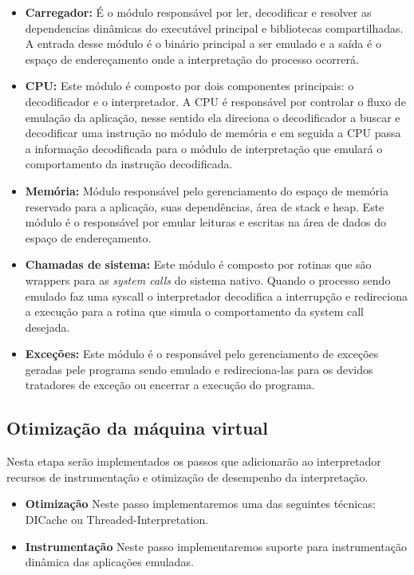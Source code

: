 \documentclass[11pt,twoside]{article}
\begin{document}
\begin{itemize}
    \item \textbf{Carregador:} É o módulo responsável por ler, decodificar e resolver as
    dependencias dinâmicas do executável principal e bibliotecas compartilhadas. A entrada 
    desse módulo é o binário principal a ser emulado e a saída é o espaço de endereçamento 
    onde a interpretação do processo ocorrerá.

    \item \textbf{CPU:} Este módulo é composto por dois componentes principais: o decodificador
    e o interpretador. A CPU é responsável por controlar o fluxo de emulação da aplicação,
    nesse sentido ela direciona o decodificador a buscar e decodificar uma instrução no
    módulo de memória e em seguida a CPU passa a informação decodificada para o módulo de 
    interpretação que emulará o comportamento da instrução decodificada.

    \item \textbf{Memória:} Módulo responsável pelo gerenciamento do espaço de memória reservado 
    para a aplicação, suas dependências, área de stack e heap. Este módulo é o responsável por
    emular leituras e escritas na área de dados do espaço de endereçamento.

    \item \textbf{Chamadas de sistema:} Este módulo é composto por rotinas que são wrappers
    para as \emph{system calls} do sistema nativo. Quando o processo sendo emulado faz uma
    syscall o interpretador decodifica a interrupção e redireciona a execução para a rotina
    que simula o comportamento da system call desejada. 
    
    \item \textbf{Exceções:} Este módulo é o responsável pelo gerenciamento de exceções 
    geradas pele programa sendo emulado e redireciona-las para os devidos tratadores de
    exceção ou encerrar a execução do programa. 
\end{itemize}

\subsection{Otimização da máquina virtual}

Nesta etapa serão implementados os passos que adicionarão ao interpretador recursos de instrumentação e otimização de desempenho da interpretação.

\begin{itemize}
 \item \textbf{Otimização} Neste passo implementaremos uma das seguintes técnicas: DICache\cite{Chen2012} ou Threaded-Interpretation\cite{Klint1981}.
 \item \textbf{Instrumentação} Neste passo implementaremos suporte para instrumentação dinâmica das aplicações emuladas.
\end{itemize}
 
\end{document}

